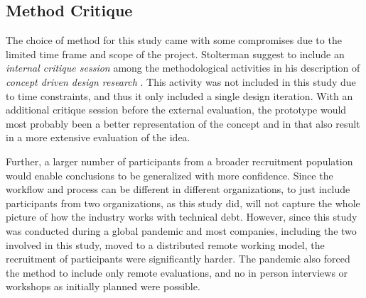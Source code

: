 \subsection{Method Critique}
The choice of method for this study came with some compromises due to the limited time frame and scope of the project.
Stolterman suggest to include an \textit{internal critique session} among the methodological activities in his description of \textit{concept driven design research} \cite{stolterman_concept-driven_2010}.
This activity was not included in this study due to time constraints, and thus it only included a single design iteration.
With an additional critique session before the external evaluation, the prototype would most probably been a better representation of the concept and in that also result in a more extensive evaluation of the idea.

Further, a larger number of participants from a broader recruitment population would enable conclusions to be generalized with more confidence.
Since the workflow and process can be different in different organizations, to just include participants from two organizations, as this study did, will not capture the whole picture of how the industry works with technical debt.
However, since this study was conducted during a global pandemic and most companies, including the two involved in this study, moved to a distributed remote working model, the recruitment of participants were significantly harder.
The pandemic also forced the method to include only remote evaluations, and no in person interviews or workshops as initially planned were possible.